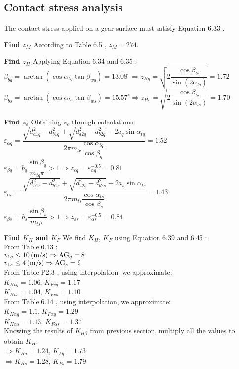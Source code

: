 \subsection{Contact stress analysis}
The contact stress applied on a gear surface must satisfy Equation 6.33 \cite{tk1}.

\textbf{Find $ z_M $} According to Table 6.5 \cite{tk1}, $ z_M = 274 $.

\textbf{Find $ z_H $} Applying Equation 6.34 \cite{tk1} and 6.35 \cite{tk1}:\\
$ \beta_{bq} = \arctan\left( \cos\alpha_{tq}\tan\beta_{wq}\right) = 13.08^\circ \Rightarrow z_{Hq} = \sqrt{2\dfrac{\cos\beta_{bq}}{\sin(2\alpha_{tq})}} = 1.72$\\
$ \beta_{bs} = \arctan\left( \cos\alpha_{ts}\tan\beta_{ws}\right) = 15.57^\circ \Rightarrow z_{Hs} = \sqrt{2\dfrac{\cos\beta_{bs}}{\sin(2\alpha_{ts})}} = 1.70$

\textbf{Find $ z_\varepsilon $} Obtaining $ z_\varepsilon $ through calculations:\\
$ \varepsilon_{\alpha q} = \dfrac{\sqrt{d_{a1q}^2-d_{b1q}^2}+\sqrt{d_{a2q}^2-d_{b2q}^2}-2a_{q}\sin\alpha_{tq}}{2\pi m_{tq}\dfrac{\cos\alpha_{tq}}{\cos\beta_q}} = 1.52$\\
$ \varepsilon_{\beta q} = b_q\dfrac{\sin\beta_q}{m_{tq}\pi} >1 \Rightarrow z_{\varepsilon q} = \varepsilon_{\alpha q}^{-0.5} = 0.81 $\\
$ \varepsilon_{\alpha s} = \dfrac{\sqrt{d_{a1s}^2-d_{b1s}^2}+\sqrt{d_{a2s}^2-d_{b2s}^2}-2a_{s}\sin\alpha_{ts}}{2\pi m_{ts}\dfrac{\cos\alpha_{ts}}{\cos\beta_s}} = 1.43$\\
$ \varepsilon_{\beta s} = b_s\dfrac{\sin\beta_s}{m_{ts}\pi} >1 \Rightarrow z_{\varepsilon s} = \varepsilon_{\alpha s}^{-0.5} = 0.84 $

\textbf{Find $ K_H $ and $ K_F $} We find $ K_H $, $ K_F $ using Equation 6.39 and 6.45 \cite{tk1}:\\
From Table 6.13 \cite{tk1}:\\
$ v_{1q}\leq 10 \, (\mathrm{m/s})\Rightarrow \text{AG}_q = 8 $ \\
$ v_{1s}\leq 4 \, (\mathrm{m/s})\Rightarrow \text{AG}_s = 9 $ \\
From Table P2.3 \cite{tk1}, using interpolation, we approximate:\\
$ K_{Hvq} = 1.06$, $ K_{Fvq} = 1.17$\\
$ K_{Hvs} = 1.04$, $ K_{Fvs} = 1.10$\\
From Table 6.14 \cite{tk1}, using interpolation, we approximate:\\
$ K_{H\alpha q} = 1.1$, $ K_{F\alpha q} = 1.29 $ \\
$ K_{H\alpha s} = 1.13$, $ K_{F\alpha s} = 1.37 $ \\		
Knowing the results of $ K_{H\beta} $ from previous section, multiply all the values to obtain $ K_H $:\\
$ \Rightarrow K_{Hq} = 1.24 $, $ K_{Fq} = 1.73 $\\
$ \Rightarrow K_{Hs} = 1.28 $, $ K_{Fs} = 1.79 $

